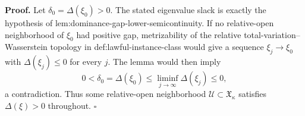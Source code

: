 \textbf{Proof.}
Let \(\delta_0=\Delta(\xi_0)>0\).  The stated eigenvalue slack is exactly the hypothesis of lem:dominance-gap-lower-semicontinuity.  If no relative-open neighborhood of \(\xi_0\) had positive gap, metrizability of the relative total-variation--Wasserstein topology in def:lawful-instance-class would give a sequence \(\xi_j\to\xi_0\) with \(\Delta(\xi_j)\le0\) for every \(j\).  The lemma would then imply
\[
 0<\delta_0=\Delta(\xi_0)
 \le \liminf_{j\to\infty}\Delta(\xi_j)\le0,
\]
a contradiction.  Thus some relative-open neighborhood \(\mathcal U\subset\mathfrak X_\kappa\) satisfies \(\Delta(\xi)>0\) throughout. \(\square\)